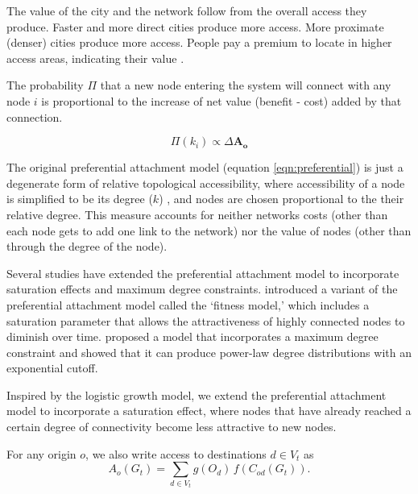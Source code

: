 \documentclass{article}[12pt]
\begin{document}
The value of the city and the network follow from the overall access they produce. Faster and more direct cities produce more access. More proximate (denser) cities produce more access. People pay a premium to locate in higher access areas, indicating their value \citep{wang2022time}.

The probability $\Pi$ that a new node entering the system will connect with any node $i$  is proportional to the increase of net value (benefit - cost) added by that connection.

\begin{equation}
\Pi(k_{i}) \propto  \Delta   \mathbf{A_{o}} 
\end{equation}




The original preferential attachment model (equation \ref{eqn:preferential}) is just a degenerate form of relative topological accessibility, where accessibility of a node is simplified to be its degree ($k$) \citep{wu2020unifying}, and nodes are chosen proportional to the their relative degree. This  measure accounts for neither networks costs (other than each node gets to add one link to the network) nor the value of nodes (other than through the degree of the node).


Several studies have extended the preferential attachment model to incorporate saturation effects and maximum degree constraints. 
 \citet{bianconi2001competition} introduced a variant of the preferential attachment model called the `fitness model,'  which includes a saturation parameter that allows the attractiveness of highly connected nodes to diminish over time. \citet{krapivsky2001organization} proposed a model that incorporates a maximum degree constraint and showed that it can produce power-law degree distributions with an exponential cutoff.

Inspired by the logistic growth model, we extend the preferential attachment model to incorporate a saturation effect, where nodes that have already reached a certain degree of connectivity become less attractive to new nodes.




For any origin $o$, we also write access to destinations $d\in V_t$ as
\begin{equation}
A_o(G_t)=\sum_{d\in V_t} g(O_d)\,f(C_{od}(G_t)).
\end{equation}
\end{document}
